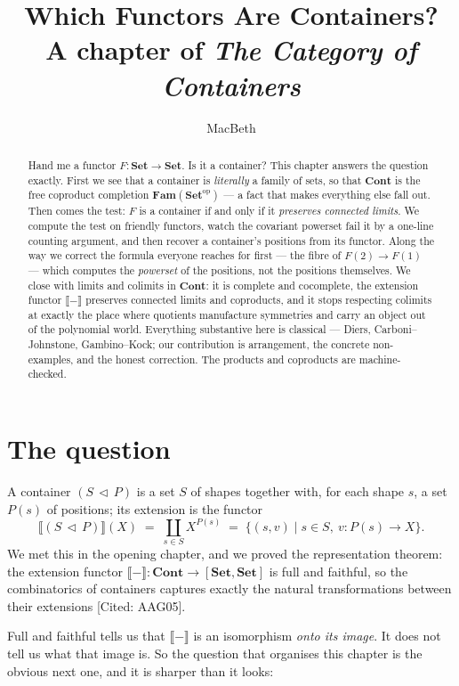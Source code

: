 \documentclass[11pt]{article}
\title{Which Functors Are Containers?\\[0.3em]
  \large A chapter of \emph{The Category of Containers}}
\author{MacBeth}
\date{}
\theoremstyle{plain}
\theoremstyle{definition}
\newcommand{\Set}{\mathbf{Set}}
\newcommand{\Cont}{\mathbf{Cont}}
\newcommand{\Fam}{\mathbf{Fam}}
\newcommand{\op}{^{\mathrm{op}}}
\newcommand{\ext}[1]{\llbracket #1 \rrbracket}
\newcommand{\cont}[2]{(#1\,\triangleleft\,#2)}
\newcommand{\prov}[1]{\hfill\textsf{[#1]}}
\begin{document}
\maketitle

\begin{abstract}
Hand me a functor $F\colon\Set\to\Set$. Is it a container? This chapter answers
the question exactly. First we see that a container is \emph{literally} a family of
sets, so that $\Cont$ is the free coproduct completion $\Fam(\Set\op)$ --- a fact
that makes everything else fall out. Then comes the test: $F$ is a container if and
only if it \emph{preserves connected limits}. We compute the test on friendly
functors, watch the covariant powerset fail it by a one-line counting argument, and
then recover a container's positions from its functor. Along the way we correct the
formula everyone reaches for first --- the fibre of $F(2)\to F(1)$ --- which computes
the \emph{powerset} of the positions, not the positions themselves. We close with
limits and colimits in $\Cont$: it is complete and cocomplete, the extension functor
$\ext{-}$ preserves connected limits and coproducts, and it stops respecting colimits
at exactly the place where quotients manufacture symmetries and carry an object out of
the polynomial world. Everything substantive here is classical --- Diers,
Carboni--Johnstone, Gambino--Kock; our contribution is arrangement, the concrete
non-examples, and the honest correction. The products and coproducts are
machine-checked.
\end{abstract}

\section*{The question}

A container $\cont SP$ is a set $S$ of shapes together with, for each shape $s$, a
set $P(s)$ of positions; its extension is the functor
\[
  \ext{\cont SP}(X) \;=\; \coprod_{s\in S} X^{P(s)}
    \;=\; \bigl\{(s,v)\mid s\in S,\ v\colon P(s)\to X\bigr\}.
\]
We met this in the opening chapter, and we proved the representation theorem: the
extension functor $\ext{-}\colon\Cont\to[\Set,\Set]$ is full and faithful, so the
combinatorics of containers captures exactly the natural transformations between their
extensions \prov{Cited: AAG05}.

Full and faithful tells us that $\ext{-}$ is an isomorphism \emph{onto its image}. It
does not tell us what that image is. So the question that organises this chapter is the
obvious next one, and it is sharper than it looks:
\end{document}
